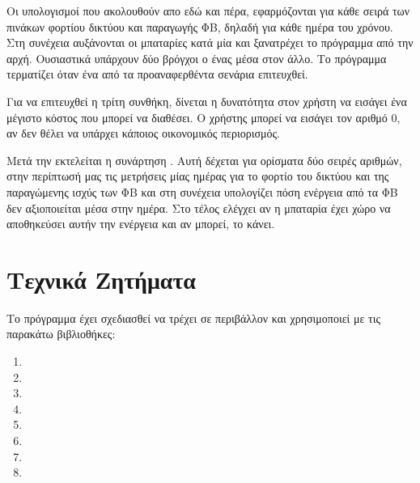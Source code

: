 \documentclass[12pt]{report}
\begin{document}
{{}

Οι υπολογισμοί που ακολουθούν απο εδώ και πέρα, εφαρμόζονται για κάθε σειρά των πινάκων φορτίου δικτύου και παραγωγής ΦΒ,
δηλαδή για κάθε ημέρα του χρόνου. Στη συνέχεια αυξάνονται οι μπαταρίες κατά μία και ξανατρέχει το πρόγραμμα από την αρχή.
Ουσιαστικά υπάρχουν δύο βρόγχοι {} ο ένας μέσα στον άλλο.
Το πρόγραμμα τερματίζει όταν ένα από τα προαναφερθέντα σενάρια επιτευχθεί.

Για να επιτευχθεί η τρίτη συνθήκη, δίνεται η δυνατότητα στον χρήστη να εισάγει ένα μέγιστο κόστος που μπορεί να διαθέσει. 
O χρήστης μπορεί να εισάγει τον αριθμό 0, αν δεν θέλει να υπάρχει κάποιος οικονομικός περιορισμός.

Μετά την {} εκτελείται η συνάρτηση {}. Αυτή δέχεται για ορίσματα δύο σειρές αριθμών,
στην περίπτωσή μας τις μετρήσεις μίας ημέρας για το φορτίο του δικτύου και της παραγώμενης ισχύς των ΦΒ και στη συνέχεια υπολογίζει 
πόση ενέργεια από τα ΦΒ δεν αξιοποιείται μέσα στην ημέρα. Στο τέλος ελέγχει αν η μπαταρία έχει χώρο να αποθηκεύσει αυτήν την ενέργεια και
αν μπορεί, το κάνει. 
\chapter{Τεχνικά Ζητήματα}
Το πρόγραμμα έχει σχεδιασθεί να τρέχει σε περιβάλλον {} και χρησιμοποιεί {} με τις παρακάτω βιβλιοθήκες:

\begin{multicols}{4}
\begin{enumerate}[label=(\Roman*)]
				\item {}
				\item {}
				\item {}
				\item {}
				\item {}
				\item {}
				\item {}
				\item {}
\end{enumerate}
\end{multicols}

}
\end{document}
